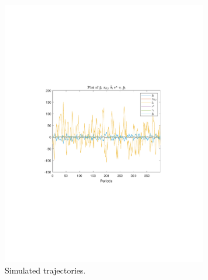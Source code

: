  
\begin{figure}[H]
\centering 
\includegraphics[width=0.80\textwidth]{fiscal/graphs/SimulatedTrajectory_y}
\caption{Simulated trajectories.}\label{Fig:SimulatedTrajectory_:y}
\end{figure}

